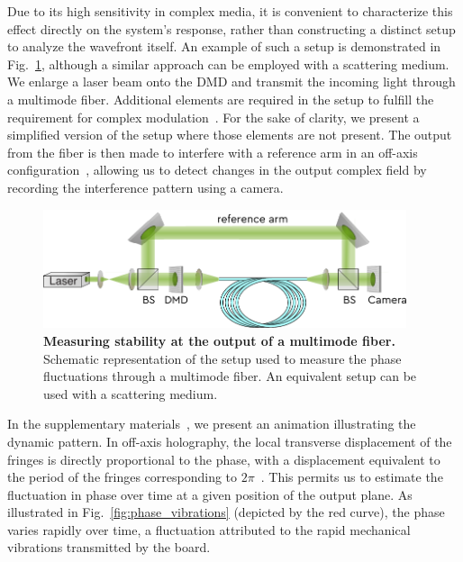 \documentclass[12pt]{iopart}
\begin{document}
Due to its high sensitivity in complex media,
it is convenient to characterize this effect
directly on the system's response,
rather than constructing a distinct setup to analyze the wavefront itself.
An example of such a setup is demonstrated in Fig.~\ref{fig:MMF_ref},
although a similar approach can be employed with a scattering medium.
We enlarge a laser beam onto the DMD and transmit the incoming light through a multimode fiber.
Additional elements are required in the setup to fulfill the requirement for complex modulation~\cite{Gutierrez2024DMD}.
For the sake of clarity, we present a simplified version of the setup where those elements are not present.
The output from the fiber is then made to interfere with a reference arm
in an off-axis configuration~\cite{Cuche2000spatial},
allowing us to detect changes in the output complex field
by recording the interference pattern using a camera.\\




\begin{figure}[ht]
  \centering
  \includegraphics[width = 0.95\textwidth]{images/MMF_ref.pdf}
  \caption{
    \textbf{Measuring stability at the output of a multimode fiber.}
    Schematic representation of the setup used to measure the phase fluctuations
    through a multimode fiber.
    An equivalent setup can be used with a scattering medium.
  }
  \label{fig:MMF_ref}
\end{figure}

In the supplementary materials~\cite{SI}, we present an animation illustrating the dynamic pattern.
In off-axis holography,
the local transverse displacement of the fringes
is directly proportional to the phase,
with a displacement equivalent to the period of the fringes corresponding to $2\pi$~\cite{Cuche2000spatial}.
This permits us to estimate the fluctuation in phase over time at a given position of the output plane.
As illustrated in Fig.~\ref{fig:phase_vibrations} (depicted by the red curve),
the phase varies rapidly over time,
a fluctuation attributed to the rapid mechanical vibrations transmitted by the board.\\
\end{document}
